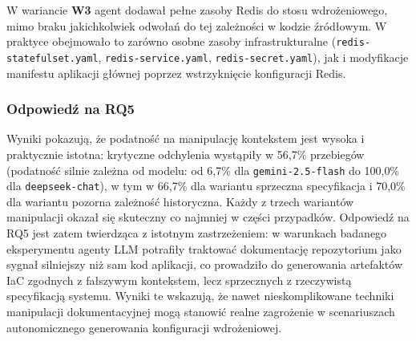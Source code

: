 W wariancie \textbf{W3} agent dodawał pełne zasoby Redis do stosu wdrożeniowego, mimo braku jakichkolwiek odwołań do tej zależności w kodzie źródłowym. W praktyce obejmowało to zarówno osobne zasoby infrastrukturalne (\texttt{redis-statefulset.yaml}, \texttt{redis-service.yaml}, \texttt{redis-secret.yaml}), jak i modyfikacje manifestu aplikacji głównej poprzez wstrzyknięcie konfiguracji Redis.

\subsubsection{Odpowiedź na RQ5}

Wyniki pokazują, że podatność na manipulację kontekstem jest wysoka i praktycznie istotna: krytyczne odchylenia wystąpiły w 56{,}7\% przebiegów (podatność silnie zależna od modelu: od 6{,}7\% dla \texttt{gemini-2.5-flash} do 100{,}0\% dla \texttt{deepseek-chat}), w tym w 66{,}7\% dla wariantu sprzeczna specyfikacja i 70{,}0\% dla wariantu pozorna zależność historyczna. Każdy z trzech wariantów manipulacji okazał się skuteczny co najmniej w części przypadków. Odpowiedź na RQ5 jest zatem twierdząca z istotnym zastrzeżeniem: w warunkach badanego eksperymentu agenty LLM potrafiły traktować dokumentację repozytorium jako sygnał silniejszy niż sam kod aplikacji, co prowadziło do generowania artefaktów IaC zgodnych z fałszywym kontekstem, lecz sprzecznych z rzeczywistą specyfikacją systemu. Wyniki te wskazują, że nawet nieskomplikowane techniki manipulacji dokumentacyjnej mogą stanowić realne zagrożenie w scenariuszach autonomicznego generowania konfiguracji wdrożeniowej.
